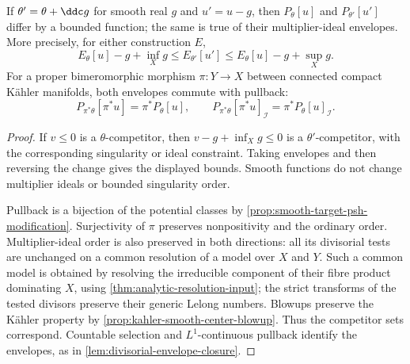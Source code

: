 \begin{proposition}\label{prop:envelopes-change-background-modification}
If $\theta'=\theta+\ddc g$ for smooth real $g$ and $u'=u-g$, then $P_\theta[u]$ and $P_{\theta'}[u']$ differ by a bounded function; the same is true of their multiplier-ideal envelopes. More precisely, for either construction $E$,
\[
 E_\theta[u]-g+\inf_Xg
       \leq E_{\theta'}[u']
       \leq E_\theta[u]-g+\sup_Xg.
\]
For a proper bimeromorphic morphism $\pi:Y\to X$ between connected compact K\"ahler manifolds, both envelopes commute with pullback:
\[
 P_{\pi^*\theta}[\pi^*u]=\pi^*P_\theta[u],\qquad
 P_{\pi^*\theta}[\pi^*u]_{\mathcal I}
                       =\pi^*P_\theta[u]_{\mathcal I}.
\]
\end{proposition}
\begin{proof}
If $v\leq0$ is a $\theta$-competitor, then $v-g+\inf_Xg\leq0$ is a $\theta'$-competitor, with the corresponding singularity or ideal constraint. Taking envelopes and then reversing the change gives the displayed bounds. Smooth functions do not change multiplier ideals or bounded singularity order.

Pullback is a bijection of the potential classes by \cref{prop:smooth-target-psh-modification}. Surjectivity of $\pi$ preserves nonpositivity and the ordinary order. Multiplier-ideal order is also preserved in both directions: all its divisorial tests are unchanged on a common resolution of a model over $X$ and $Y$. Such a common model is obtained by resolving the irreducible component of their fibre product dominating $X$, using \cref{thm:analytic-resolution-input}; the strict transforms of the tested divisors preserve their generic Lelong numbers. Blowups preserve the K\"ahler property by \cref{prop:kahler-smooth-center-blowup}. Thus the competitor sets correspond. Countable selection and $L^1$-continuous pullback identify the envelopes, as in \cref{lem:divisorial-envelope-closure}.
\end{proof}

